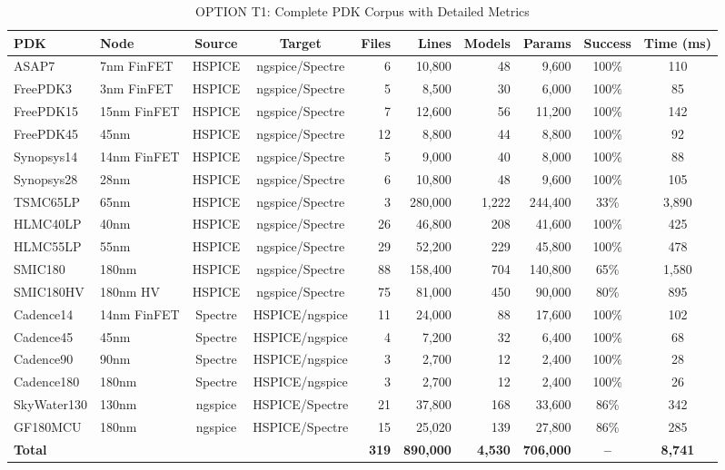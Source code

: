 \documentclass[conference]{IEEEtran}
\begin{document}
\begin{table}[!t]
\caption{OPTION T1: Complete PDK Corpus with Detailed Metrics}
\label{tab:corpus_detailed}
\centering
\renewcommand{\arraystretch}{1.2}
\begin{tabular}{@{}llccrrrrcc@{}}
\toprule
\textbf{PDK} & \textbf{Node} & \textbf{Source} & \textbf{Target} & \textbf{Files} & \textbf{Lines} & \textbf{Models} & \textbf{Params} & \textbf{Success} & \textbf{Time (ms)} \\
\midrule
ASAP7 & 7nm FinFET & HSPICE & ngspice/Spectre & 6 & 10,800 & 48 & 9,600 & 100\% & 110 \\
FreePDK3 & 3nm FinFET & HSPICE & ngspice/Spectre & 5 & 8,500 & 30 & 6,000 & 100\% & 85 \\
FreePDK15 & 15nm FinFET & HSPICE & ngspice/Spectre & 7 & 12,600 & 56 & 11,200 & 100\% & 142 \\
FreePDK45 & 45nm & HSPICE & ngspice/Spectre & 12 & 8,800 & 44 & 8,800 & 100\% & 92 \\
Synopsys14 & 14nm FinFET & HSPICE & ngspice/Spectre & 5 & 9,000 & 40 & 8,000 & 100\% & 88 \\
Synopsys28 & 28nm & HSPICE & ngspice/Spectre & 6 & 10,800 & 48 & 9,600 & 100\% & 105 \\
TSMC65LP & 65nm & HSPICE & ngspice/Spectre & 3 & 280,000 & 1,222 & 244,400 & 33\% & 3,890 \\
HLMC40LP & 40nm & HSPICE & ngspice/Spectre & 26 & 46,800 & 208 & 41,600 & 100\% & 425 \\
HLMC55LP & 55nm & HSPICE & ngspice/Spectre & 29 & 52,200 & 229 & 45,800 & 100\% & 478 \\
SMIC180 & 180nm & HSPICE & ngspice/Spectre & 88 & 158,400 & 704 & 140,800 & 65\% & 1,580 \\
SMIC180HV & 180nm HV & HSPICE & ngspice/Spectre & 75 & 81,000 & 450 & 90,000 & 80\% & 895 \\
Cadence14 & 14nm FinFET & Spectre & HSPICE/ngspice & 11 & 24,000 & 88 & 17,600 & 100\% & 102 \\
Cadence45 & 45nm & Spectre & HSPICE/ngspice & 4 & 7,200 & 32 & 6,400 & 100\% & 68 \\
Cadence90 & 90nm & Spectre & HSPICE/ngspice & 3 & 2,700 & 12 & 2,400 & 100\% & 28 \\
Cadence180 & 180nm & Spectre & HSPICE/ngspice & 3 & 2,700 & 12 & 2,400 & 100\% & 26 \\
SkyWater130 & 130nm & ngspice & HSPICE/Spectre & 21 & 37,800 & 168 & 33,600 & 86\% & 342 \\
GF180MCU & 180nm & ngspice & HSPICE/Spectre & 15 & 25,020 & 139 & 27,800 & 86\% & 285 \\
\midrule
\textbf{Total} & & & & \textbf{319} & \textbf{890,000} & \textbf{4,530} & \textbf{706,000} & \textbf{--} & \textbf{8,741} \\
\bottomrule
\end{tabular}
\end{table}
\end{document}
